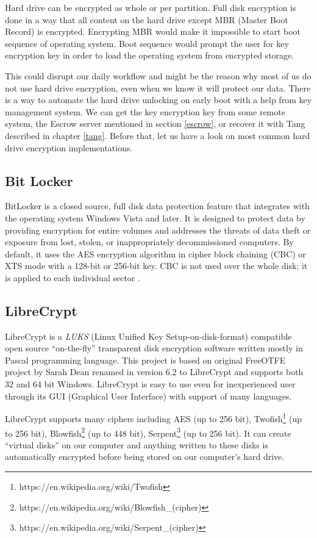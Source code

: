 Hard drive can be encrypted as whole or per partition.
Full disk encryption is done in a way that all content on the hard drive except MBR (Master Boot Record) is encrypted.
Encrypting MBR would make it impossible to start boot sequence of operating system.
Boot sequence would prompt the user for key encryption key in order to load the operating system from encrypted storage.

This could disrupt our daily workflow and might be the reason why most of us do not use hard drive encryption, even when we know it will protect our data.
There is a way to automate the hard drive unlocking on early boot with a help from key management system.
We can get the key encryption key from some remote system, the Escrow server mentioned in section \ref{escrow}, or recover it with Tang described in chapter \ref{tang}.
Before that, let us have a look on most common hard drive encryption implementations.



\subsection{Bit Locker}
BitLocker is a closed source, full disk data protection feature that integrates with the operating system Windows Vista and later.
It is designed to protect data by providing encryption for entire volumes and addresses the threats of data theft or exposure from lost, stolen, or inappropriately decommissioned computers.
By default, it uses the AES encryption algorithm in cipher block chaining (CBC) or XTS mode with a 128-bit or 256-bit key.
CBC is not used over the whole disk; it is applied to each individual sector \cite{bitlocker}.



\subsection{LibreCrypt}

LibreCrypt is a {\it LUKS} (Linux Unified Key Setup-on-disk-format) compatible open source “on-the-fly” transparent disk encryption software written mostly in Pascal programming language.
This project is based on original FreeOTFE project by Sarah Dean renamed in version 6.2 to LibreCrypt and supports both 32 and 64 bit Windows.
LibreCrypt is easy to use even for inexperienced user through its GUI (Graphical User Interface) with support of many languages.

LibreCrypt supports many ciphers including AES (up to 256 bit), Twofish\footnote{https://en.wikipedia.org/wiki/Twofish} (up to 256 bit), Blowfish\footnote{https://en.wikipedia.org/wiki/Blowfish\_(cipher)} (up to 448 bit), Serpent\footnote{https://en.wikipedia.org/wiki/Serpent\_(cipher)} (up to 256 bit).
It can create “virtual disks” on our computer and anything written to these disks is automatically encrypted before being stored on our computer’s hard drive\cite{FreeOTFE}.


